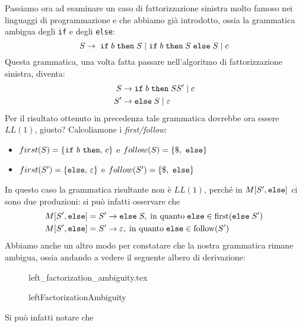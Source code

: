 \documentclass[class=book, crop=false, oneside, 12pt]{standalone}
\begin{document}
Passiamo ora ad esaminare un caso di fattorizzazione sinistra molto famoso nei linguaggi di programmazione e che abbiamo già introdotto, ossia la grammatica ambigua degli \texttt{if} e degli \texttt{else}:
\begin{equation*}
    S \rightarrow \; \textrm{\texttt{if}} \; b \; \textrm{\texttt{then}} \; S \mid \textrm{\texttt{if}} \; b \; \textrm{\texttt{then}} \; S \; \textrm{\texttt{else}} \; S \mid c  
\end{equation*}
Questa grammatica, una volta fatta passare nell'algoritmo di fattorizzazione sinistra, diventa:
\begin{align*}
    S &\rightarrow \textrm{\texttt{if}} \; b \; \textrm{\texttt{then}} \; SS' \mid c \\
    S' &\rightarrow \textrm{\texttt{else}} \; S \mid \varepsilon
\end{align*}
Per il risultato ottenuto in precedenza tale grammatica dovrebbe ora essere \(LL(1)\), giusto? Calcoliamone i \emph{first/follow}: 
\begin{itemize}
    \item \(first(S) = \{\textrm{\texttt{if} } b \textrm{ \texttt{then}, } c\}\) e \(follow(S) = \{\$, \textrm{ \texttt{else}}\}\)
    \item \(first(S') = \{\textrm{\texttt{else}, } \varepsilon\}\) e \(follow(S') = \{\$, \textrm{ \texttt{else}}\}\)
\end{itemize}  
In questo caso la grammatica risultante non è \(LL(1)\), perché in \(M[S', \textrm{\texttt{else}}]\) ci sono due produzioni: si può infatti osservare che 
\begin{align*}
    M[S', \textrm{\texttt{else}}] &= S' \rightarrow \textrm{\texttt{else}} \; S, \; \textrm{in quanto} \; \textrm{\texttt{else}} \in \textrm{first}(\textrm{\texttt{else}} \; S') \\
    M[S', \textrm{\texttt{else}}] &= S' \to \varepsilon, \; \textrm{in quanto} \; \textrm{\texttt{else}} \in \textrm{follow}(S')
\end{align*}
Abbiamo anche un altro modo per constatare che la nostra grammatica rimane ambigua, ossia andando a vedere il seguente albero di derivazione:
\begin{figure}[H]
    \centering
    {left_factorization_ambiguity.tex}
    \caption{leftFactorizationAmbiguity}
    \label{leftFactorizationAmbiguity}
\end{figure}

Si può infatti notare che
\end{document}
